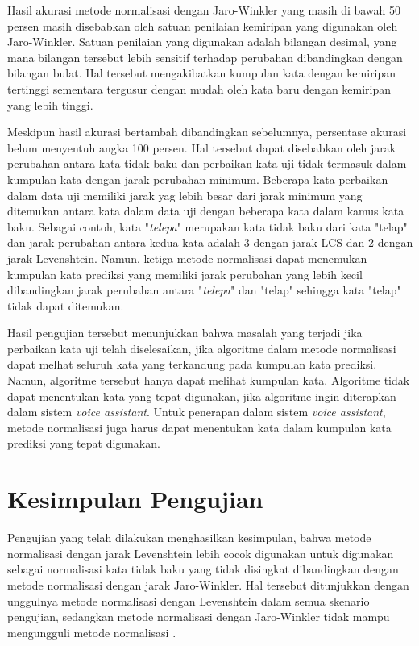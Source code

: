 Hasil akurasi metode normalisasi dengan Jaro-Winkler yang masih di bawah 50 persen masih disebabkan oleh satuan penilaian kemiripan yang digunakan oleh Jaro-Winkler. Satuan penilaian yang digunakan adalah bilangan desimal, yang mana bilangan tersebut lebih sensitif terhadap perubahan dibandingkan dengan bilangan bulat. Hal tersebut mengakibatkan kumpulan kata dengan kemiripan tertinggi sementara tergusur dengan mudah oleh kata baru dengan kemiripan yang lebih tinggi.

Meskipun hasil akurasi bertambah dibandingkan sebelumnya, persentase akurasi belum menyentuh angka 100 persen. Hal tersebut dapat disebabkan oleh jarak perubahan antara kata tidak baku dan perbaikan kata uji tidak termasuk dalam kumpulan kata dengan jarak perubahan minimum. Beberapa kata perbaikan dalam data uji memiliki jarak yag lebih besar dari jarak minimum yang ditemukan antara kata dalam data uji dengan beberapa kata dalam kamus kata baku. Sebagai contoh, kata "\textit{telepa}" merupakan kata tidak baku dari kata "telap" dan jarak perubahan antara kedua kata adalah 3 dengan jarak LCS dan 2 dengan jarak Levenshtein. Namun, ketiga metode normalisasi dapat menemukan kumpulan kata prediksi yang memiliki jarak perubahan yang lebih kecil dibandingkan jarak perubahan antara "\textit{telepa}" dan "telap" sehingga kata "telap" tidak dapat ditemukan.

Hasil pengujian tersebut menunjukkan bahwa masalah yang terjadi jika perbaikan kata uji telah diselesaikan, jika algoritme dalam metode normalisasi dapat melhat seluruh kata yang terkandung pada kumpulan kata prediksi. Namun, algoritme tersebut hanya dapat melihat kumpulan kata. Algoritme tidak dapat menentukan kata yang tepat digunakan, jika algoritme ingin diterapkan dalam sistem \textit{voice assistant}. Untuk penerapan dalam sistem \textit{voice assistant}, metode normalisasi juga harus dapat menentukan kata dalam kumpulan kata prediksi yang tepat digunakan.

\section{Kesimpulan Pengujian}

Pengujian yang telah dilakukan menghasilkan kesimpulan, bahwa metode normalisasi dengan jarak Levenshtein lebih cocok digunakan untuk digunakan sebagai normalisasi kata tidak baku yang tidak disingkat dibandingkan dengan metode normalisasi dengan jarak Jaro-Winkler. Hal tersebut ditunjukkan dengan unggulnya metode normalisasi dengan Levenshtein dalam semua skenario pengujian, sedangkan metode normalisasi dengan Jaro-Winkler tidak mampu mengungguli metode normalisasi \parencite{saragih2017normalisasi}.